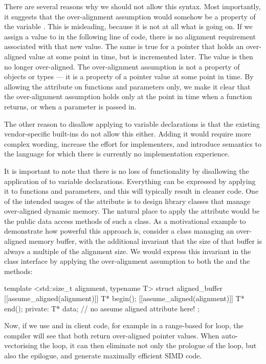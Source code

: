 There are several reasons why we should not allow this syntax. Most importantly, it suggests that the over-alignment assumption would somehow be a property of the variable . This is misleading, because it is not at all what is going on. If we assign a value to  in the following line of code, there is no alignment requirement associated with that new value. The same is true for a pointer that holds an over-aligned value at some point in time, but is incremented later. The value is then no longer over-aligned. The over-alignment assumption is not a property of objects or types --- it is a property of a pointer value at some point in time. By allowing the attribute on functions and parameters only, we make it clear that the over-alignment assumption holds only at the point in time when a function returns, or when a parameter is passed in.

The other reason to disallow applying  to variable declarations is that the existing vendor-specific built-ins do not allow this either. Adding it would  require more complex wording, increase the effort for implementers, and introduce semantics to the language for which there is currently no implementation experience.

It is important to note that there is no loss of functionality by disallowing the application of  to variable declarations. Everything can be expressed by applying it to functions and parameters, and this will typically result in cleaner code. One of the intended usages of the attribute is to design library classes that manage over-aligned dynamic memory. The natural place to apply the attribute would be the public data access methods of such a class. As a motivational example to demonstrate how powerful this approach is, consider a class managing an over-aligned memory buffer, with the additional invariant that the size of that buffer is always a multiple of the alignment size. We would express this invariant in the class interface by applying the over-alignment assumption to both the  and the  methods:

\begin{codeblock}
template <std::size_t alignment, typename T>
struct aligned_buffer
{
   [[assume_aligned(alignment)]] T* begin();
   [[assume_aligned(alignment)]] T* end();
private:
   T* data;   // no assume aligned attribute here!
};
\end{codeblock}

Now, if we use  and  in client code, for example in a range-based for loop, the compiler will see that both return over-aligned pointer values. When auto-vectorising the loop, it can then eliminate not only the prologue of the loop, but also the epilogue, and generate maximally efficient SIMD code.

